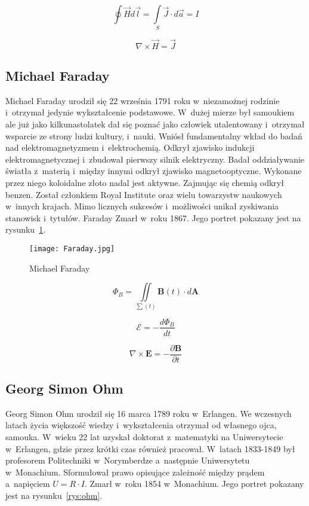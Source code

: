 \begin{equation}
    \oint \vec{H} d\vec{l} = \int\limits_{S} \vec{J} \cdot d \vec{a} = I
\end{equation}

\begin{equation}
    \nabla \times \vec{H} = \vec{J}
\end{equation}

\subsection{Michael Faraday}
Michael Faraday urodził się 22 września 1791 roku w~niezamożnej rodzinie i~otrzymał jedynie wykształcenie podstawowe. W~dużej mierze był samoukiem ale już jako kilkunastolatek dał się poznać jako człowiek utalentowany i~otrzymał wsparcie ze strony ludzi kultury, i~nauki. Wniósł fundamentalny wkład do badań nad elektromagnetyzmem i~elektrochemią. Odkrył zjawisko indukcji elektromagnetycznej i~zbudował pierwszy silnik elektryczny. Badał oddziaływanie światła z~materią i~między innymi odkrył zjawisko magnetooptyczne. Wykonane przez niego koloidalne złoto nadal jest aktywne. Zajmując się chemią odkrył benzen. Został członkiem Royal Institute oraz wielu towarzystw naukowych w~innych krajach. Mimo licznych sukcesów i~możliwości unikał zyskiwania stanowisk i~tytułów. Faraday Zmarł w~roku 1867. Jego portret pokazany jest na rysunku~\ref{rys:faraday}.

\begin{figure}[!ht]
    \centering \texttt{[image: Faraday.jpg]}
    \caption{Michael Faraday}
    \label{rys:faraday}
\end{figure}

\begin{equation*}
    \Phi_B = \iint\limits_{\sum (t)} \pmb{B}(t) \cdot d\pmb{A}
\end{equation*}

\begin{equation}
    \mathcal{E} = -\frac{d\Phi_B}{dt}
\end{equation}

\begin{equation}
    \nabla \times \pmb{E} = - \frac{\partial \pmb{B}}{\partial t}
\end{equation}


\subsection{Georg Simon Ohm}
Georg Simon Ohm urodził się 16 marca 1789 roku w~Erlangen. We wczesnych latach życia większość wiedzy i~wykształcenia otrzymał od własnego ojca, samouka. W~wieku 22 lat uzyskał doktorat z~matematyki na Uniwersytecie w~Erlangen, gdzie przez krótki czas również pracował. W~latach 1833-1849 był profesorem Politechniki w~Norymberdze a~następnie Uniwersytetu w~Monachium. Sformułował prawo opisujące zależność między prądem a~napięciem $U=R \cdot I$. Zmarł w~roku 1854 w~Monachium. Jego portret pokazany jest na rysunku~\ref{rys:ohm}.

